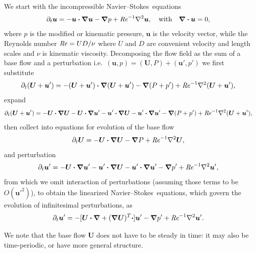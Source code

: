 \documentclass[11pt,a4paper]{report}
\newcommand\Rey{\mbox{\textit{Re}}}
\newcommand\NavSto{Navier--Stokes}
\newcommand\LNS{linearized \NavSto}
\newcommand\LNSE{\LNS\ equations}
\newcommand{\ie}{i.e.\ }
\newcommand\Ubase{{\bm{U}}}
\newcommand\Pbase{P}
\newcommand\upert{{\bm{u}'}}
\newcommand\ppert{{p}'}
\newcommand\uvec{\bm{u}}
\begin{document}
We start with the incompressible \NavSto\ equations
\begin{equation}
\partial_t\uvec=-\uvec\bm{\cdot \nabla}\uvec -\bm{\nabla} p
+\Rey^{-1}\nabla^2 \uvec, \quad \text{with} \quad\bm{\nabla\cdot}\uvec=0,
\end{equation}
where $p$ is the modified or kinematic pressure, $\uvec$ is the
velocity vector, while the Reynolds number $\Rey=UD/\nu$ where $U$ and
$D$ are convenient velocity and length scales and $\nu$ is kinematic
viscosity. 
%
Decomposing the flow field as the sum of a base flow and a
perturbation \ie $(\uvec,p)=(\Ubase,P)+(\upert,\ppert)$ we first substitute
\begin{equation}
\partial_t(\Ubase+\upert) = -(\Ubase+\upert)\bm{\cdot\nabla}(\Ubase+\upert)
  - \bm{\nabla}(\Pbase+\ppert)
  + \Rey^{-1}\nabla^2(\Ubase+\upert),
\end{equation}
expand
\begin{equation}
\partial_t(\Ubase+\upert) =
-\Ubase\bm{\cdot\nabla}\Ubase
-\Ubase\bm{\cdot\nabla}\upert
-\upert\bm{\cdot\nabla}\Ubase
-\upert\bm{\cdot\nabla}\upert
- \bm{\nabla}(\Pbase+\ppert)  
+ \Rey^{-1}\nabla^2(\Ubase+\upert), 
\end{equation}
then collect into equations for evolution of the base flow
\begin{equation}
\partial_t\Ubase =
-\Ubase\bm{\cdot\nabla}\Ubase
- \bm{\nabla}\Pbase
+ \Rey^{-1}\nabla^2\Ubase,
\end{equation}
and perturbation
\begin{equation}
\partial_t\upert =
-\Ubase\bm{\cdot\nabla}\upert
-\upert\bm{\cdot\nabla}\Ubase
-\upert\bm{\cdot\nabla}\upert
- \bm{\nabla}\ppert
+ \Rey^{-1}\nabla^2\upert,
\end{equation}
from which we omit interaction of perturbations (assuming those terms
to be $O(\upert^2)$), to obtain the \LNSE, which
govern the evolution of infinitesimal perturbations, as
\begin{equation}
\partial_t\upert
=-[\bm{U \cdot\nabla}+(\bm{\nabla U})^T\bm{\cdot}] \upert 
-\bm{\nabla} \ppert+\Rey^{-1}\nabla^2 \upert.
\label{eq.LNS} 				
\end{equation}

We note that the base flow $\Ubase$ does not have to be steady in
time: it may also be time-periodic, or have more general structure.
\end{document}

